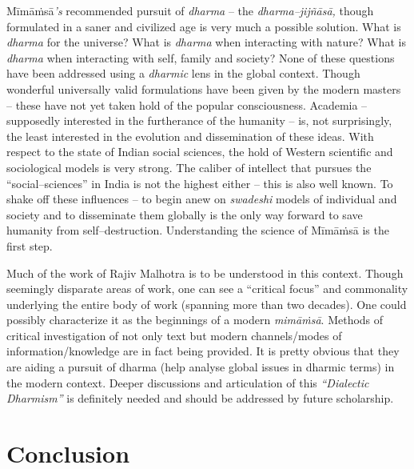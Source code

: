 Mīmāṁsā\textit{’s} recommended pursuit of \textit{dharma} – the \textit{dharma–jijñāsā,} though formulated in a saner and civilized age is very much a possible solution. What is \textit{dharma} for the universe? What is \textit{dharma} when interacting with nature? What is \textit{dharma} when interacting with self, family and society? None of these questions have been addressed using a \textit{dharmic} lens in the global context. Though wonderful universally valid formulations have been given by the modern masters – these have not yet taken hold of the popular consciousness. Academia – supposedly interested in the furtherance of the humanity – is, not surprisingly, the least interested in the evolution and dissemination of these ideas. With respect to the state of Indian social sciences, the hold of Western scientific and sociological models is very strong. The caliber of intellect that pursues the “social–sciences” in India is not the highest either – this is also well known. To shake off these influences – to begin anew on \textit{swadeshi} models of individual and society and to disseminate them globally is the only way forward to save humanity from self–destruction. Understanding the science of Mīmāṁsā is the first step.

Much of the work of Rajiv Malhotra is to be understood in this context. Though seemingly disparate areas of work, one can see a “critical focus” and commonality underlying the entire body of work (spanning more than two decades). One could possibly characterize it as the beginnings of a modern \textit{mimāṁsā}. Methods of critical investigation of not only text but modern channels/modes of information/knowledge are in fact being provided. It is pretty obvious that they are aiding a pursuit of dharma (help analyse global issues in dharmic terms) in the modern context. Deeper discussions and articulation of this \textit{“Dialectic Dharmism”} is definitely needed and should be addressed by future scholarship.


\section*{Conclusion}

